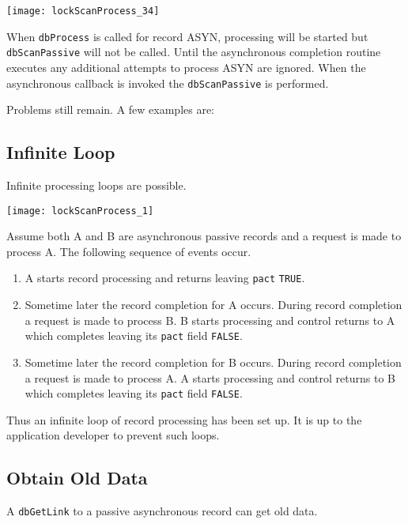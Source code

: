 \begin{center}
\texttt{[image: lockScanProcess\_34]}
\end{center}

When \verb|dbProcess| is called for record ASYN, processing will be started but \verb|dbScanPassive| will not be called. Until 
the asynchronous completion routine executes any additional attempts to process ASYN are ignored. When the 
asynchronous callback is invoked the \verb|dbScanPassive| is performed.

Problems still remain. A few examples are:

\subsection{Infinite Loop}

Infinite processing loops are possible.

\begin{center}
\texttt{[image: lockScanProcess\_1]}
\end{center}

Assume both A and B are asynchronous passive records and a request is made to process A. The following sequence of 
events occur.

\begin{enumerate}\item A starts record processing and returns leaving \verb|pact| \verb|TRUE|.

\item Sometime later the record completion for A occurs. During record completion a request is made to process B. B 
starts processing and control returns to A which completes leaving its \verb|pact| field \verb|FALSE|.

\item Sometime later the record completion for B occurs. During record completion a request is made to process A. A 
starts processing and control returns to B which completes leaving its \verb|pact| field \verb|FALSE|.

\end{enumerate}Thus an infinite loop of record processing has been set up. It is up to the application developer to prevent such loops.

\subsection{Obtain Old Data}

A \verb|dbGetLink| to a passive asynchronous record can get old data.

